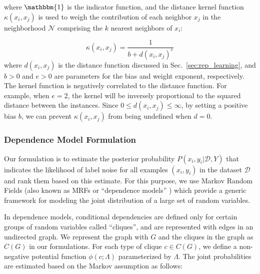 where $\mathbbm{1}$ is the indicator function, and the distance kernel function $\kappa(x_i, x_j)$ is used to weigh the contribution of each neighbor $x_j$ in the neighborhood $\mathcal{N}$ comprising the $k$ nearest neighbors of $x_i$:  

\begin{equation} \label{eq:dist_kernel}
    \kappa(x_i, x_j) = \frac{1}{b + d(x_i, x_j)^e}
\end{equation}
where $d(x_i, x_j)$ is the distance function discussed in Sec.~\ref{sec:rep_learning}, and $b>0$ and $e>0$ are parameters for the bias and weight exponent, respectively. The kernel function is negatively correlated to the distance function. For example, when $e=2$, the kernel will be inversely proportional to the squared distance between the instances. Since $0 \leq d(x_i, x_j) \leq \infty$, by setting a positive bias $b$, we can prevent $\kappa(x_i, x_j)$ from being undefined when $d=0$.

\subsubsection {Dependence Model Formulation} \label{sec:dep_formulate}

Our formulation is to estimate the posterior probability $P(x_{i}, y_{i}|\mathcal{D}, Y)$ that indicates the likelihood of label noise for all examples $(x_{i},y_{i})$ in the dataset $\mathcal{D}$ and rank them based on this estimate. 
For this purpose, we use Markov Random Fields (also known as MRFs or ``dependence models'' \cite{MetzlerMRF05,YalnizPAMI19}) which provide a generic framework for modeling the joint distribution of a large set of random variables. 

In dependence models, conditional dependencies are defined only for certain groups of random variables called ``cliques'', and are represented with edges in an undirected graph. We represent the graph with $G$ and the cliques in the graph as $C(G)$ in our formulations. For each type of clique $c\in C(G)$, we define a non-negative potential function $\phi(c;\Lambda)$ parameterized by $\Lambda$. The joint probabilities are estimated based on the Markov assumption as follows:

